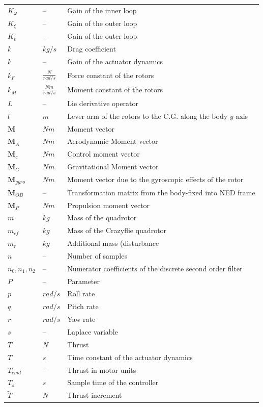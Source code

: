 \documentclass[11pt, a4paper, twoside]{report}
\begin{document}
\begin{table}[H]
  \begin{tabular}{p{2.5cm} p{1.5cm} p{10cm}} 
    $K_{\omega}$ & -- & Gain of the inner loop \\
    $K_{\xi}$ & -- & Gain of the outer loop \\
    $K_{\dot{v}}$ & -- & Gain of the outer loop \\
    $k$ & $kg/s$ & Drag coefficient \\ 
    $k$ & -- & Gain of the actuator dynamics \\ 
    $k_F$ & $\frac{N}{rad/s}$ & Force constant of the rotors \\
    $k_M$ & $\frac{Nm}{rad/s}$ & Moment constant of the rotors \\
    $L$ & -- & Lie derivative operator \\
    $l$ & $m$ & Lever arm of the rotors to the C.G. along the body $y$-axis \\
    $\bm{M}$ & $Nm$ & Moment vector \\
    $\bm{M}_A$ & $Nm$ & Aerodynamic Moment vector \\
    $\bm{M}_c$ & $Nm$ & Control moment vector \\
    $\bm{M}_G$ & $Nm$ & Gravitational Moment vector \\
    $\bm{M}_{gyro}$ & $Nm$ & Moment vector due to the gyroscopic effects of the rotor \\
    $\bm{M}_{OB}$ & -- & Transformation matrix from the body-fixed into NED frame \\
    $\bm{M}_P$ & $Nm$ & Propulsion moment vector \\
    $m$ & $kg$ & Mass of the quadrotor \\
    $m_{cf}$ & $kg$ & Mass of the Crazyflie quadrotor \\
    $m_r$ & $kg$ & Additional mass (disturbance \\
    $n$ & -- & Number of samples \\
    $n_0, n_1, n_2$ & -- & Numerator coefficients of the discrete second order filter \\
    $P$ & -- & Parameter \\
    $p$ & $rad/s$ & Roll rate \\ 
	$q$ & $rad/s$ & Pitch rate \\
    $r$ & $rad/s$ & Yaw rate \\
	$s$ & -- & Laplace variable \\
    $T$ & $N$ & Thrust \\
	$T$ & $s$ & Time constant of the actuator dynamics \\
    $T_{cmd}$ & -- & Thrust in motor units \\
	$T_s$ & $s$ & Sample time of the controller \\
    $\tilde{T}$ & $N$ & Thrust increment \\ %
  \end{tabular}
  \captionsetup{font=bf, belowskip=-0.5cm}
  \label{table:tab_latin_2}
\end{table}
\end{document}
